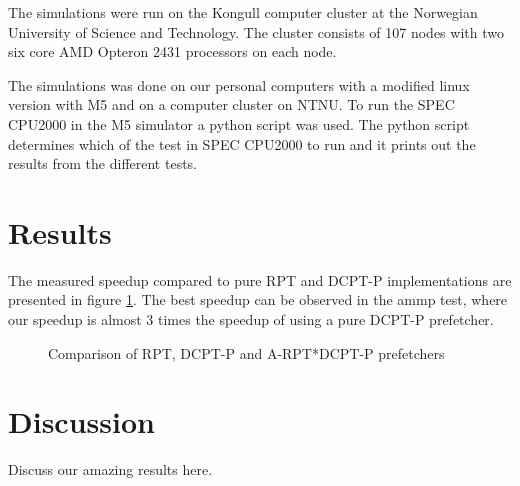 \documentclass[journal,a4paper]{IEEEtran}
\begin{document}

The simulations were run on the Kongull computer cluster at the Norwegian University
of Science and Technology. The cluster consists of 107 nodes with two six core AMD
Opteron 2431 processors on each node\cite{kongull}.

The simulations was done on our personal computers with a modified linux version with
M5 and on a computer cluster on NTNU. To run the SPEC CPU2000 in the M5 simulator a
python script was used. The python script determines which of the test in SPEC CPU2000
to run and it prints out the results from the different tests. 

\section{Results}
The measured speedup compared to pure RPT and DCPT-P implementations are presented in
figure \ref{fig:results}. The best speedup can be observed in the ammp test, where
our speedup is almost 3 times the speedup of using a pure DCPT-P prefetcher.

\begin{figure}
	\caption{Comparison of RPT, DCPT-P and A-RPT*DCPT-P prefetchers}
	\label{fig:results}
	\centering

\end{figure}

\section{Discussion}
Discuss our amazing results here.
\end{document}
